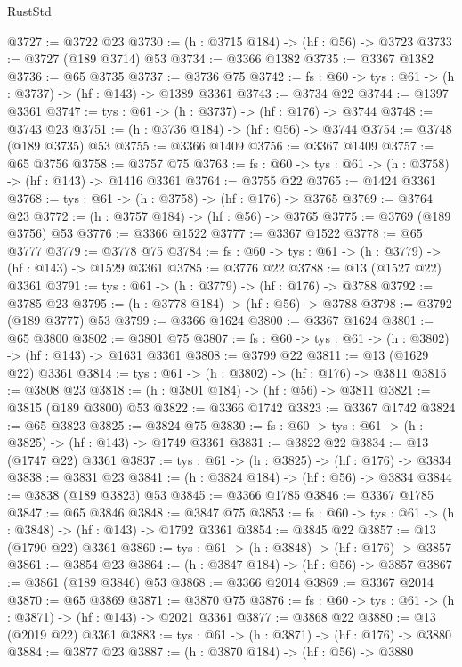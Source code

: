 \begin{lexlean}{RustStd}
\begin{coremodule}
@3727 := @3722 @23
@3730 := (h : @3715 @184) -> (hf : @56) -> @3723
@3733 := @3727 (@189 @3714) @53
@3734 := @3366 @1382
@3735 := @3367 @1382
@3736 := @65 @3735
@3737 := @3736 @75
@3742 := {fs : @60} -> {tys : @61} -> (h : @3737) -> (hf : @143) -> @1389 @3361
@3743 := @3734 @22
@3744 := @1397 @3361
@3747 := {tys : @61} -> (h : @3737) -> (hf : @176) -> @3744
@3748 := @3743 @23
@3751 := (h : @3736 @184) -> (hf : @56) -> @3744
@3754 := @3748 (@189 @3735) @53
@3755 := @3366 @1409
@3756 := @3367 @1409
@3757 := @65 @3756
@3758 := @3757 @75
@3763 := {fs : @60} -> {tys : @61} -> (h : @3758) -> (hf : @143) -> @1416 @3361
@3764 := @3755 @22
@3765 := @1424 @3361
@3768 := {tys : @61} -> (h : @3758) -> (hf : @176) -> @3765
@3769 := @3764 @23
@3772 := (h : @3757 @184) -> (hf : @56) -> @3765
@3775 := @3769 (@189 @3756) @53
@3776 := @3366 @1522
@3777 := @3367 @1522
@3778 := @65 @3777
@3779 := @3778 @75
@3784 := {fs : @60} -> {tys : @61} -> (h : @3779) -> (hf : @143) -> @1529 @3361
@3785 := @3776 @22
@3788 := @13 (@1527 @22) @3361
@3791 := {tys : @61} -> (h : @3779) -> (hf : @176) -> @3788
@3792 := @3785 @23
@3795 := (h : @3778 @184) -> (hf : @56) -> @3788
@3798 := @3792 (@189 @3777) @53
@3799 := @3366 @1624
@3800 := @3367 @1624
@3801 := @65 @3800
@3802 := @3801 @75
@3807 := {fs : @60} -> {tys : @61} -> (h : @3802) -> (hf : @143) -> @1631 @3361
@3808 := @3799 @22
@3811 := @13 (@1629 @22) @3361
@3814 := {tys : @61} -> (h : @3802) -> (hf : @176) -> @3811
@3815 := @3808 @23
@3818 := (h : @3801 @184) -> (hf : @56) -> @3811
@3821 := @3815 (@189 @3800) @53
@3822 := @3366 @1742
@3823 := @3367 @1742
@3824 := @65 @3823
@3825 := @3824 @75
@3830 := {fs : @60} -> {tys : @61} -> (h : @3825) -> (hf : @143) -> @1749 @3361
@3831 := @3822 @22
@3834 := @13 (@1747 @22) @3361
@3837 := {tys : @61} -> (h : @3825) -> (hf : @176) -> @3834
@3838 := @3831 @23
@3841 := (h : @3824 @184) -> (hf : @56) -> @3834
@3844 := @3838 (@189 @3823) @53
@3845 := @3366 @1785
@3846 := @3367 @1785
@3847 := @65 @3846
@3848 := @3847 @75
@3853 := {fs : @60} -> {tys : @61} -> (h : @3848) -> (hf : @143) -> @1792 @3361
@3854 := @3845 @22
@3857 := @13 (@1790 @22) @3361
@3860 := {tys : @61} -> (h : @3848) -> (hf : @176) -> @3857
@3861 := @3854 @23
@3864 := (h : @3847 @184) -> (hf : @56) -> @3857
@3867 := @3861 (@189 @3846) @53
@3868 := @3366 @2014
@3869 := @3367 @2014
@3870 := @65 @3869
@3871 := @3870 @75
@3876 := {fs : @60} -> {tys : @61} -> (h : @3871) -> (hf : @143) -> @2021 @3361
@3877 := @3868 @22
@3880 := @13 (@2019 @22) @3361
@3883 := {tys : @61} -> (h : @3871) -> (hf : @176) -> @3880
@3884 := @3877 @23
@3887 := (h : @3870 @184) -> (hf : @56) -> @3880

\end{coremodule}
\end{lexlean}
